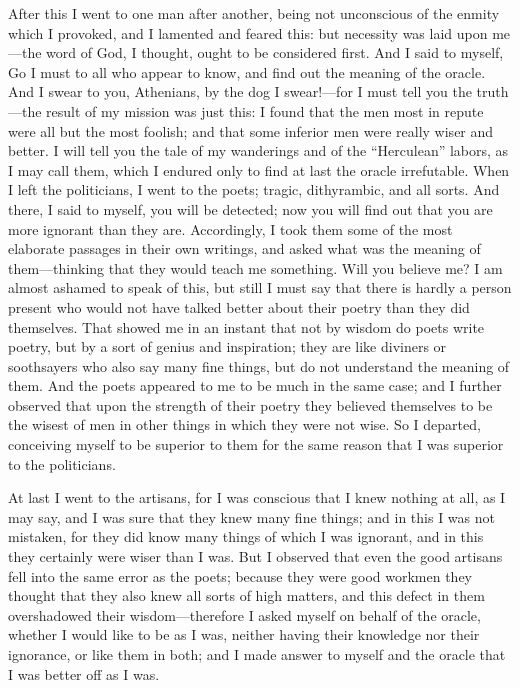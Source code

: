 \documentclass[12pt]{article}
\begin{document}
After this I went to one man after another, being not unconscious
of the enmity which I provoked, and I lamented and feared this: but
necessity was laid upon me---the word of God, I thought, ought to
be considered first. And I said to myself, Go I must to all who appear
to know, and find out the meaning of the oracle. And I swear to you,
Athenians, by the dog I swear!---for I must tell you the truth---the
result of my mission was just this: I found that the men most in repute
were all but the most foolish; and that some inferior men were really
wiser and better. I will tell you the tale of my wanderings and of
the ``Herculean'' labors, as I may call them, which I endured only to
find at last the oracle irrefutable. When I left the politicians,
I went to the poets; tragic, dithyrambic, and all sorts. And there,
I said to myself, you will be detected; now you will find out that
you are more ignorant than they are. Accordingly, I took them some
of the most elaborate passages in their own writings, and asked what
was the meaning of them---thinking that they would teach me something.
Will you believe me? I am almost ashamed to speak of this, but still
I must say that there is hardly a person present who would not have
talked better about their poetry than they did themselves. That showed
me in an instant that not by wisdom do poets write poetry, but by
a sort of genius and inspiration; they are like diviners or soothsayers
who also say many fine things, but do not understand the meaning of
them. And the poets appeared to me to be much in the same case; and
I further observed that upon the strength of their poetry they believed
themselves to be the wisest of men in other things in which they were
not wise. So I departed, conceiving myself to be superior to them
for the same reason that I was superior to the politicians.

At last I went to the artisans, for I was conscious that I knew nothing
at all, as I may say, and I was sure that they knew many fine things;
and in this I was not mistaken, for they did know many things of which
I was ignorant, and in this they certainly were wiser than I was.
But I observed that even the good artisans fell into the same error
as the poets; because they were good workmen they thought that they
also knew all sorts of high matters, and this defect in them overshadowed
their wisdom---therefore I asked myself on behalf of the oracle, whether
I would like to be as I was, neither having their knowledge nor their
ignorance, or like them in both; and I made answer to myself and the
oracle that I was better off as I was.
\end{document}
